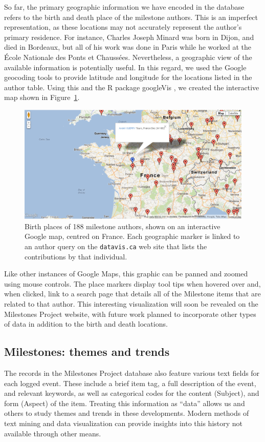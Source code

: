 \documentclass[11pt]{article}
\newcommand*{\figref}[1]{Figure~\ref{#1}}
\begin{document}
So far, the primary geographic information we have encoded in the database refers to the birth and death place of the milestone authors. This is an imperfect representation, as these locations may not accurately represent the author's primary residence.  For instance, Charles Joseph Minard was born in Dijon, and died in Bordeaux, but all of his work was done in Paris while he worked at the {\'E}cole Nationale des Ponts et Chauss{\'e}es. Nevertheless, a geographic view of the available information is potentially useful. In this regard, we used the Google geocoding tools to provide latitude and longitude for the locations listed in the author table.  Using this and the R package googleVis \citep{googleVis}, we created the interactive map shown in \figref{fig:authormap}.

\begin{figure}[!htb]
  \centering
  \includegraphics[width=\textwidth,clip]{fig/authormap}
  \caption{Birth places of 188 milestone authors, shown on an interactive Google map, centred on France. Each geographic marker is linked to an author query on the \texttt{datavis.ca} web site that lists the contributions by that individual.}
  \label{fig:authormap}
\end{figure}

Like other instances of Google Maps, this graphic can be panned and zoomed using mouse controls. The place markers display tool tips when hovered over and, when clicked, link to a search page that details all of the Milestone items that are related to that author. This interesting visualization will soon be revealed on the Milestones Project website, with future work planned to incorporate other types of data in addition to the birth and death locations.

\subsection{Milestones: themes and trends}\label{sec:themes}
The records in the Milestones Project database also feature various text fields for each logged event. These include a brief item tag, a full description of the event, and relevant keywords, as well as categorical codes for the content (Subject), and form  (Aspect) of the item. Treating this information as ``data'' allows us and others to study themes and trends in these developments.  Modern methods of text mining and data visualization can provide insights into this history not available through other means.
\end{document}
